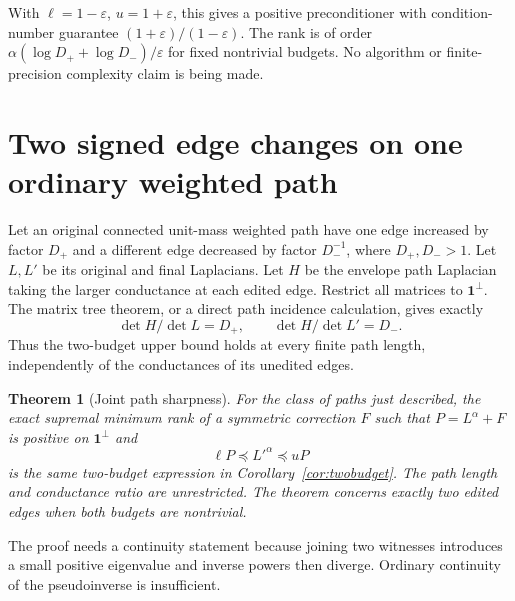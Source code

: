 \documentclass[11pt]{article}
\newtheorem{theorem}{Theorem}[section]
\begin{document}
With $\ell=1-\varepsilon$, $u=1+\varepsilon$, this gives a positive
preconditioner with condition-number guarantee $(1+\varepsilon)/(1-\varepsilon)$.
The rank is of order $\alpha(\log D_++\log D_-)/\varepsilon$ for
fixed nontrivial budgets. No algorithm or finite-precision complexity
claim is being made.

\section{Two signed edge changes on one ordinary weighted path}

Let an original connected unit-mass weighted path have one edge increased
by factor $D_+$ and a different edge decreased by factor $D_-^{-1}$,
where $D_+,D_->1$. Let $L,L'$ be its original and final Laplacians.
Let $H$ be the envelope path Laplacian taking the larger conductance at
each edited edge. Restrict all matrices to $\mathbf1^\perp$. The matrix
tree theorem, or a direct path incidence calculation, gives exactly
\[
      \det H/\det L=D_+,\qquad \det H/\det L'=D_-.
\]
Thus the two-budget upper bound holds at every finite path length,
independently of the conductances of its unedited edges.

\begin{theorem}[Joint path sharpness]\label{thm:path}
For the class of paths just described, the exact supremal minimum rank of
a symmetric correction $F$ such that $P=L^\alpha+F$ is positive on
$\mathbf1^\perp$ and
\[
                   \ell P\preceq L'^\alpha\preceq uP
\]
is the same two-budget expression in Corollary~\ref{cor:twobudget}.
The path length and conductance ratio are unrestricted. The theorem
concerns exactly two edited edges when both budgets are nontrivial.
\end{theorem}

The proof needs a continuity statement because joining two witnesses
introduces a small positive eigenvalue and inverse powers then diverge.
Ordinary continuity of the pseudoinverse is insufficient.
\end{document}
